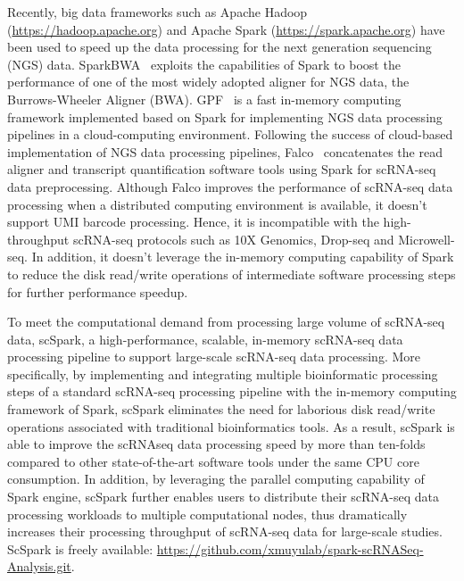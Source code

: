\documentclass[conference]{IEEEtran}
\begin{document}
Recently, big data frameworks such as Apache Hadoop (\url{https://hadoop.apache.org}) and Apache Spark (\url{https://spark.apache.org}) have been used to speed up the data processing for the next generation sequencing (NGS) data. 
SparkBWA~\cite{Abun2016SparkBWA} exploits the capabilities of Spark to boost the performance of one of the most widely adopted aligner for NGS data, the Burrows-Wheeler Aligner (BWA). 
GPF~\cite{Li2018Highperformance} is a fast in-memory computing framework implemented based on Spark for implementing NGS data processing pipelines in a cloud-computing environment. 
Following the success of cloud-based implementation of NGS data processing pipelines, Falco~\cite{Yang2017Falco} concatenates the read aligner and transcript quantification software tools using Spark for scRNA-seq data preprocessing.
Although Falco improves the performance of scRNA-seq data processing when a distributed computing environment is available, it doesn't support UMI barcode processing. Hence, it is incompatible with the high-throughput scRNA-seq protocols such as 10X Genomics, Drop-seq and Microwell-seq. In addition, it doesn't leverage the in-memory computing capability of Spark to reduce the disk read/write operations of intermediate software processing steps for further performance speedup.  

To meet the computational demand from processing large volume of scRNA-seq data,
scSpark, a high-performance, scalable, in-memory scRNA-seq data processing pipeline to support large-scale scRNA-seq data processing. More specifically, 
by implementing and integrating multiple bioinformatic processing steps of a standard scRNA-seq processing pipeline with the in-memory computing framework of Spark, scSpark eliminates the need for laborious disk read/write operations associated with traditional bioinformatics tools.
As a result, scSpark is able to improve the scRNAseq data processing speed by more than ten-folds compared to other state-of-the-art software tools under the same CPU core consumption. In addition, by leveraging the parallel computing capability of Spark engine, scSpark further enables users to distribute their scRNA-seq data processing workloads to multiple computational nodes, thus dramatically increases their processing throughput of scRNA-seq data for large-scale studies. 
ScSpark is freely available: \url{https://github.com/xmuyulab/spark-scRNASeq-Analysis.git}.
\end{document}

